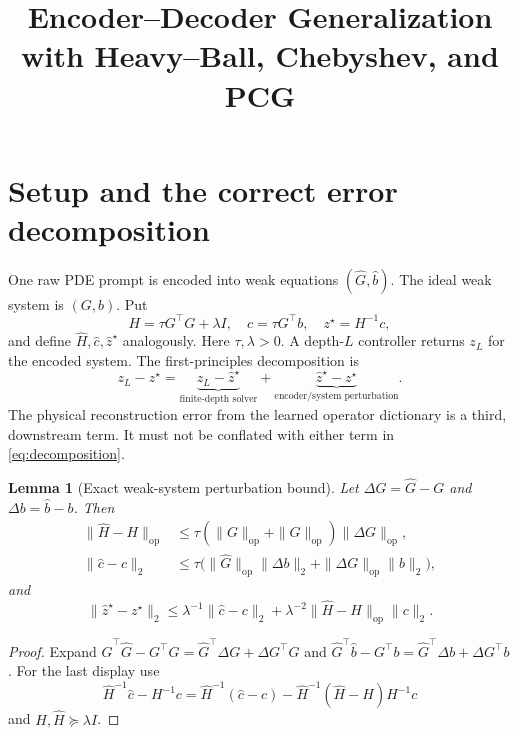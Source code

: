 \documentclass[11pt]{article}
\title{Encoder--Decoder Generalization with Heavy--Ball, Chebyshev, and PCG}
\author{}
\date{}
\newtheorem{lemma}{Lemma}
\newcommand{\op}{\mathrm{op}}
\begin{document}
\maketitle

\section{Setup and the correct error decomposition}

One raw PDE prompt is encoded into weak equations $(\widehat G,\widehat b)$.
The ideal weak system is $(G,b)$.  Put
\[
 H=\tau G^\top G+\lambda I,
 \quad c=\tau G^\top b,
 \quad z^\star=H^{-1}c,
\]
and define $\widehat H,\widehat c,\widehat z^\star$ analogously.  Here
$\tau,\lambda>0$.  A depth-$L$ controller returns $z_L$ for the encoded
system.  The first-principles decomposition is
\begin{equation}
 z_L-z^\star
 =\underbrace{z_L-\widehat z^\star}_{\text{finite-depth solver}}
 +\underbrace{\widehat z^\star-z^\star}_{\text{encoder/system perturbation}}.
 \label{eq:decomposition}
\end{equation}
The physical reconstruction error from the learned operator dictionary is a
third, downstream term.  It must not be conflated with either term in
\eqref{eq:decomposition}.

\begin{lemma}[Exact weak-system perturbation bound]
\label{lem:ridge-perturbation}
Let $\Delta G=\widehat G-G$ and $\Delta b=\widehat b-b$.  Then
\begin{align}
 \|\widehat H-H\|_{\op}
 &\leq \tau(\|G\|_{\op}+\|\widehat G\|_{\op})
 \|\Delta G\|_{\op},\label{eq:delta-H}\\
 \|\widehat c-c\|_2
 &\leq\tau\bigl(
 \|\widehat G\|_{\op}\|\Delta b\|_2
 +\|\Delta G\|_{\op}\|b\|_2\bigr),\label{eq:delta-c}
\end{align}
and
\begin{equation}
 \|\widehat z^\star-z^\star\|_2
 \leq \lambda^{-1}\|\widehat c-c\|_2
 +\lambda^{-2}\|\widehat H-H\|_{\op}\|c\|_2.
 \label{eq:ridge-transfer}
\end{equation}
\end{lemma}
\begin{proof}
Expand
$\widehat G^\top\widehat G-G^\top G
=\widehat G^\top\Delta G+\Delta G^\top G$ and
$\widehat G^\top\widehat b-G^\top b
=\widehat G^\top\Delta b+\Delta G^\top b$.
For the last display use
\[
 \widehat H^{-1}\widehat c-H^{-1}c
 =\widehat H^{-1}(\widehat c-c)
 -\widehat H^{-1}(\widehat H-H)H^{-1}c
\]
and $H,\widehat H\succeq\lambda I$.
\end{proof}
\end{document}
